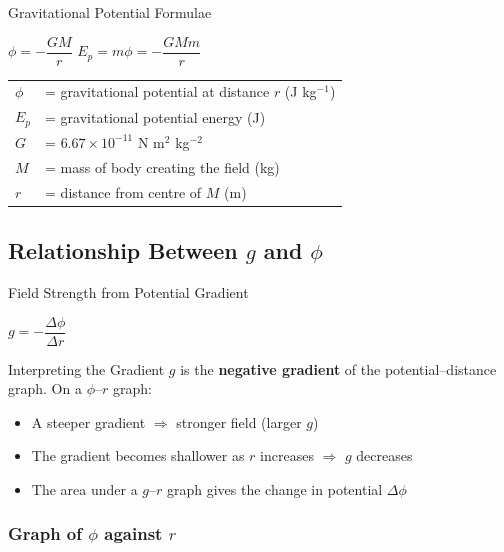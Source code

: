 \begin{formulabox}{Gravitational Potential Formulae}
\begin{center}
\Large $\phi = -\dfrac{GM}{r}$ \qquad $E_p = m\phi = -\dfrac{GMm}{r}$
\end{center}
\vspace{0.3em}
\begin{tabular}{@{}ll@{}}
$\phi$ & = gravitational potential at distance $r$ (J kg$^{-1}$) \\
$E_p$ & = gravitational potential energy (J) \\
$G$ & = $6.67 \times 10^{-11}$ N m$^2$ kg$^{-2}$ \\
$M$ & = mass of body creating the field (kg) \\
$r$ & = distance from centre of $M$ (m) \\
\end{tabular}
\end{formulabox}

\subsection{Relationship Between $g$ and $\phi$}

\begin{formulabox}{Field Strength from Potential Gradient}
\begin{center}
\large $g = -\dfrac{\Delta\phi}{\Delta r}$
\end{center}
\end{formulabox}

\begin{keybox}{Interpreting the Gradient}
$g$ is the \textbf{negative gradient} of the potential--distance graph. On a $\phi$--$r$ graph:
\begin{itemize}[itemsep=2pt]
  \item A steeper gradient $\Rightarrow$ stronger field (larger $g$)
  \item The gradient becomes shallower as $r$ increases $\Rightarrow$ $g$ decreases
  \item The area under a $g$--$r$ graph gives the change in potential $\Delta\phi$
\end{itemize}
\end{keybox}

\subsubsection*{Graph of $\phi$ against $r$}

